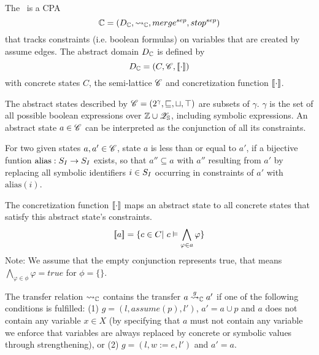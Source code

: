 \subsection{\constraintsCPA}

The \constraintsCPA\ is a CPA \[\mathbb{C} = (D_{\mathbb{C}}, \rightsquigarrow_{\mathbb{C}}, merge^{sep}, stop^{sep})\] that tracks constraints (i.e. boolean formulas) on variables that are created by assume edges.
The abstract domain $D_{\mathbb{C}}$ is defined by 
\[D_{\mathbb{C}} = (C, \mathscr{C}, [\![ \cdot ]\!])\]
with concrete states $C$, the semi-lattice $\mathscr{C}$ and concretization function $[\![ \cdot ]\!]$.

The abstract states described by $\mathscr{C} = (2^\gamma, \sqsubseteq, \sqcup, \top)$ are subsets of $\gamma$.
$\gamma$ is the set of all possible boolean expressions over $\mathbb{Z} \cup \mathscr{Z}_{\mathbb{S}}$, including symbolic expressions.
An abstract state $a \in \mathscr{C}$ can be interpreted as the conjunction of all its constraints.

For two given states $a, a' \in \mathscr{C}$, state $a$ is less than or equal to $a'$, if a bijective funtion $\text{alias}: S_I \rightarrow S_I$ exists, so that $a'' \subseteq a$ with $a''$ resulting from $a'$ by replacing all symbolic identifiers $i \in S_I$ occurring in constraints of $a'$ with $\text{alias}(i)$.

The concretization function $[\![ \cdot ]\!]$ maps an abstract state to all concrete states that satisfy this abstract state's constraints.
        \[ [\![ a ]\!] = \{ c \in C |\ c \vDash \displaystyle\bigwedge_{\varphi \in a} \varphi \} \]
        Note: We assume that the empty conjunction represents true, that means $\displaystyle\bigwedge_{\varphi \in \phi} \varphi = true$ for $\phi = \{\}$.

The transfer relation $\rightsquigarrow_{\mathbb{C}}$ contains the transfer $a \overset{g}{\rightsquigarrow}_{\mathbb{C}} a'$ if one of the following conditions is fulfilled:
(1) $g = (l, assume(p), l')$, $a' = a \cup {p}$ and $a$ does not contain any variable $x \in X$
(by specifying that $a$ must not contain any variable we enforce that variables are always replaced by concrete or symbolic values through strengthening), or
(2) $g = (l, w := e, l')$ and $a' = a$.

